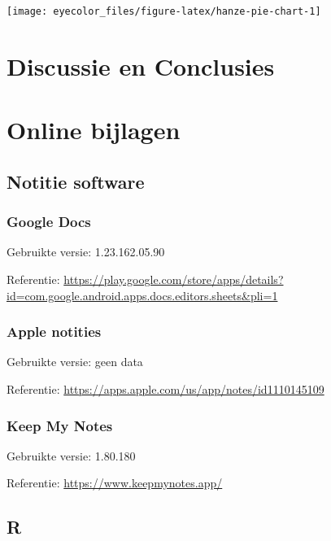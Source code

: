 \documentclass[
]{article}
\begin{document}
\texttt{[image: eyecolor\_files/figure-latex/hanze-pie-chart-1]}

\hypertarget{discussie-en-conclusies}{%
\section{Discussie en Conclusies}\label{discussie-en-conclusies}}

\hypertarget{online-bijlagen}{%
\section{Online bijlagen}\label{online-bijlagen}}

\hypertarget{notitie-software}{%
\subsection{Notitie software}\label{notitie-software}}

\hypertarget{g-docs}{%
\subsubsection{Google Docs}\label{g-docs}}

Gebruikte versie: 1.23.162.05.90

Referentie:
\url{https://play.google.com/store/apps/details?id=com.google.android.apps.docs.editors.sheets\&pli=1}

\hypertarget{a-notes}{%
\subsubsection{Apple notities}\label{a-notes}}

Gebruikte versie: geen data

Referentie: \url{https://apps.apple.com/us/app/notes/id1110145109}

\hypertarget{keep-my-notes}{%
\subsubsection{Keep My Notes}\label{keep-my-notes}}

Gebruikte versie: 1.80.180

Referentie: \url{https://www.keepmynotes.app/}

\hypertarget{r-lang}{%
\subsection{R}\label{r-lang}}
\end{document}
